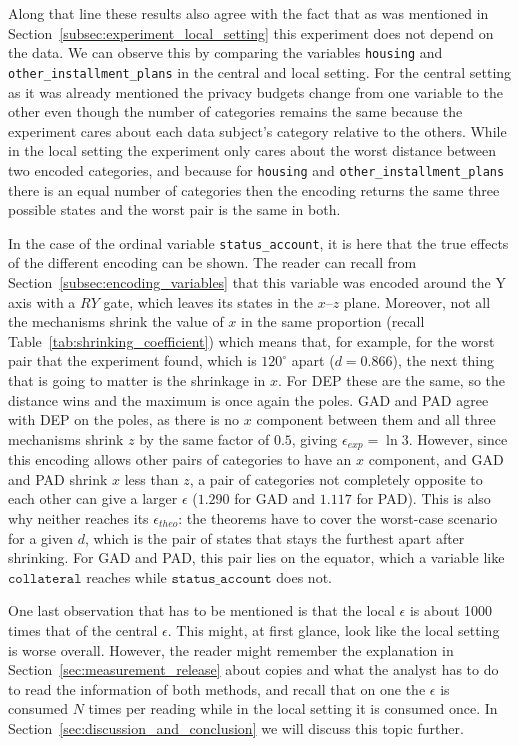 \documentclass{ieeeaccess}
\begin{document}
Along that line these results also agree with the fact that as was mentioned in Section~\ref{subsec:experiment_local_setting} this experiment does not depend on the data. We can observe this by comparing the variables \texttt{housing} and \texttt{other\_installment\_plans} in the central and local setting. For the central setting as it was already mentioned the privacy budgets change from one variable to the other even though the number of categories remains the same because the experiment cares about each data subject's category relative to the others. While in the local setting the experiment only cares about the worst distance between two encoded categories, and because for \texttt{housing} and \texttt{other\_installment\_plans} there is an equal number of categories then the encoding returns the same three possible states and the worst pair is the same in both.

In the case of the ordinal variable \texttt{status\_account}, it is here that the true effects of the different encoding can be shown. The reader can recall from Section~\ref{subsec:encoding_variables} that this variable was encoded around the Y axis with a $RY$ gate, which leaves its states in the $x$--$z$ plane. Moreover, not all the mechanisms shrink the value of $x$ in the same proportion (recall Table~\ref{tab:shrinking_coefficient}) which means that, for example, for the worst pair that the experiment found, which is $120^{\circ}$ apart ($d=0.866$), the next thing that is going to matter is the shrinkage in $x$. For DEP these are the same, so the distance wins and the maximum is once again the poles. GAD and PAD agree with DEP on the poles, as there is no $x$ component between them and all three mechanisms shrink $z$ by the same factor of $0.5$, giving $\epsilon_{exp} = \ln 3$. However, since this encoding allows other pairs of categories to have an $x$ component, and GAD and PAD shrink $x$ less than $z$, a pair of categories not completely opposite to each other can give a larger $\epsilon$ ($1.290$ for GAD and $1.117$ for PAD). This is also why neither reaches its $\epsilon_{theo}$: the theorems have to cover the worst-case scenario for a given $d$, which is the pair of states that stays the furthest apart after shrinking. For GAD and PAD, this pair lies on the equator, which a variable like $\texttt{collateral}$ reaches while $\texttt{status\_account}$ does not.

One last observation that has to be mentioned is that the local $\epsilon$ is about 1000 times that of the central $\epsilon$. This might, at first glance, look like the local setting is worse overall. However, the reader might remember the explanation in Section~\ref{sec:measurement_release} about copies and what the analyst has to do to read the information of both methods, and recall that on one the $\epsilon$ is consumed $N$ times per reading while in the local setting it is consumed once. In Section~\ref{sec:discussion_and_conclusion} we will discuss this topic further.
\end{document}
